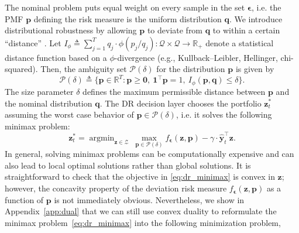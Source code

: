 \documentclass[10pt, twocolumn]{article}
\theoremstyle{plain}
\theoremstyle{definition}
\def\rev#1{\textcolor{revBlue}{#1}}
\DeclareMathOperator*{\argmin}{argmin}
\begin{document}
The nominal problem puts equal weight on every sample in 
the set \(\bm{\epsilon}\), i.e. the PMF \(\bm{p}\) defining the risk measure 
is the uniform distribution \(\bm{q}\). We introduce distributional
robustness by allowing \(\bm{p}\) to deviate from \(\bm{q}\) to within a
certain ``distance'' \citep{calafiore2007ambiguous, ben2013robust, kannan2020residuals,
costa2021datadriven}. Let \(I_\phi \triangleq \sum_{j=1}^T q_j\cdot
\phi(p_j/q_j):  \mathcal{Q} \times \mathcal{Q}
\rightarrow \mathbb{R}_+\) denote a statistical distance  function
based on a \(\phi\)-divergence (e.g., Kullback--Leibler, Hellinger, chi-squared).
Then, the ambiguity set \(\mathcal{P}(\delta)\) for
the distribution \(\bm{p}\) is given by 
\[
  \mathcal{P}(\delta) \triangleq \big\{\bm{p} \in\mathbb{R}^T :
  \bm{p}\geq \bm{0},\ \bm{1}^\top \bm{p} = 1,\ I_\phi(\bm{p},\bm{q})
  \leq \delta\big\}.
\]
The size parameter \(\delta\) defines the maximum permissible distance
between \(\bm{p}\) and the nominal distribution \(\bm{q}\). The DR
decision layer chooses the portfolio \(\bm{z}^{*}_{t}\) assuming the worst
case behavior of \(\bm{p} \in \mathcal{P}({\delta})\), i.e. it solves the
following minimax problem: 
\begin{equation}
\label{eq:dr_minimax}
	\bm{z}_{t}^* = \argmin_{\bm{z}\in\mathcal{Z}}\ \max_{\bm{p}\in\mathcal{P(\delta)}} f_{\bm{\epsilon}}(\bm{z}, \bm{p}) - \gamma\cdot \hat{\bm{y}}_{t}^\top \bm{z}.
\end{equation}
In general, solving minimax problems can be computationally expensive and
can also lead to local optimal solutions rather than global solutions.
It is straightforward to check that the objective in \eqref{eq:dr_minimax}
is convex in \(\bm{z}\); however, the concavity property of the deviation 
risk measure \(f_{\bm{\epsilon}}(\bm{z}, \bm{p}) \) as a function of \(\bm{p}\) 
is not immediately obvious. Nevertheless, we show in Appendix~\ref{app:dual} 
that we can still use convex duality to reformulate the minimax 
problem~\eqref{eq:dr_minimax} into the following
minimization problem, 
\end{document}
